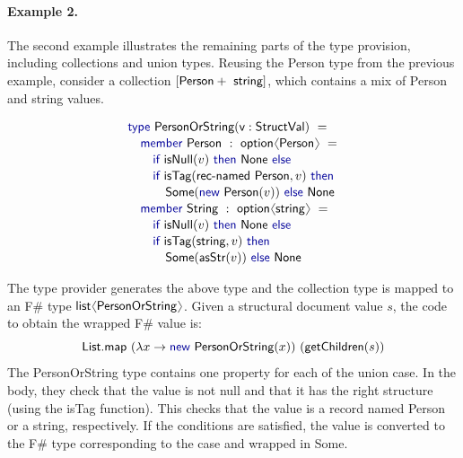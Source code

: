 \documentclass[preprint]{sigplanconf}
\newcommand{\langl}{\begin{picture}(4.5,7)
\put(1.1,2.5){\rotatebox{60}{\line(1,0){5.5}}}
\put(1.1,2.5){\rotatebox{300}{\line(1,0){5.5}}}
\end{picture}}
\newcommand{\rangl}{\begin{picture}(4.5,7)
\put(.9,2.5){\rotatebox{120}{\line(1,0){5.5}}}
\put(.9,2.5){\rotatebox{240}{\line(1,0){5.5}}}
\end{picture}}
\newcommand{\kvd}[1]{\textnormal{\textcolor{kvdclr}{\sffamily #1}}}
\newcommand{\ident}[1]{\textnormal{\sffamily #1}}
\begin{document}
\paragraph{Example 2.} The second example illustrates the remaining parts of the type provision,
including collections and union types. Reusing the \ident{Person} type from the previous example,
consider a collection $[\ident{Person}+\ident{string}]$, which contains a mix of \ident{Person} and string values.

\noindent
\begin{equation*}
\begin{array}{l}
 \kvd{type}~\ident{PersonOrString}(\ident{v}:\ident{StructVal})~= \\[0.1em]
 \quad \kvd{member}~\ident{Person}~:~\ident{option}\langl\ident{Person}\rangl~= \\[0.1em]
 \qquad \kvd{if}~\ident{isNull}(v)~\kvd{then}~\ident{None}~\kvd{else} \\[0.1em]
 \qquad \kvd{if}~\ident{isTag}(\ident{rec-named Person}, v)~\kvd{then}~\\[0.1em]
 \qquad\quad \ident{Some}(\kvd{new}~\ident{Person}(v))~\kvd{else}~\ident{None} \\[0.1em]
 \quad \kvd{member}~\ident{String}~:~\ident{option}\langl\ident{string}\rangl~= \\[0.1em]
 \qquad \kvd{if}~\ident{isNull}(v)~\kvd{then}~\ident{None}~\kvd{else} \\[0.1em]
 \qquad \kvd{if}~\ident{isTag}(\ident{string}, v)~\kvd{then}~\\[0.1em]
 \qquad\quad \ident{Some}(\ident{asStr}(v))~\kvd{else}~\ident{None}
\end{array}
\end{equation*}

\noindent
The type provider generates the above type and the collection type is mapped to an F\# type 
$\ident{list}\langl\ident{PersonOrString}\rangl$. Given a structural document value $s$, the code
to obtain the wrapped F\# value is:
%
\begin{equation*}
\ident{List.map}~(\lambda x\rightarrow\kvd{new}~\ident{PersonOrString}(x))~(\ident{getChildren}(s))
\end{equation*}
%
The \ident{PersonOrString} type contains one property for each of the union case. In the body, they
check that the value is not \kvd{null} and that it has the right structure (using the \ident{isTag}
function). This checks that the value is a record named \ident{Person} or a string, respectively.
If the conditions are satisfied, the value is converted to the F\# type corresponding to the case
and wrapped in \ident{Some}.
\end{document}
